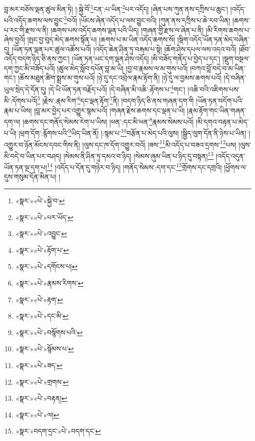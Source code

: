 བླ་མར་བཅོས་ལྡན་ཚུལ་མིན་ཏེ། །:སྐྱེ་བོ་\footnote{«སྣར་»«པེ་»སྐྱེ་བ་}ངན་:པ་ཡིན་\footnote{«སྣར་»«པེ་»པར་ཡོད་}པར་འདོད། །ཞེན་པས་ཀུན་ནས་དཀྲིས་པ་ཆུང་། །འདོད་པའི་འདོད་ཆགས་ལས་བྱུང་\footnote{«སྣར་»«པེ་»འབྱུང་}བའོ། །ཡོངས་ཞེན་འདོད་པ་ལས་བྱུང་བའི། །ཀུན་ནས་དཀྲིས་པ་ཆེ་རབ་ཡིན། །ཆགས་པ་རང་གི་རྫས་ལ་ནི། །ཆགས་པས་འདོད་ཆགས་ལྡན་པའི་ཡིད། །གཞན་གྱི་རྫས་ལ་ཞེན་པ་ནི། །མི་རིགས་ཆགས་པ་ཞེས་བྱའོ། །སྤང་བྱ་བུད་མེད་ཆགས་སྟོན་པ། །ཆགས་པ་མ་ཡིན་འདོད་ཆགས་སོ། །སྡིག་འདོད་ཡོན་ཏན་མེད་བཞིན་དུ། །ཡོན་ཏན་ལྡན་པར་ཚུལ་འཆོས་པའོ། །འདོད་ཆེན་ཤིན་ཏུ་བརྐམ་པ་སྟེ། །ཆོག་ཤེས་དཔལ་ལས་འདའ་བའོ། །ཐོབ་འདོད་བདག་ཉིད་ཅི་ནས་ཀྱང་། །ཡོན་ཏན་ཡང་དག་ལྡན་ཤེས་འདོད། །མི་བཟོད་གནོད་པ་བྱེད་པ་དང་། །སྡུག་བསྔལ་དག་ཀྱང་མི་བཟོད་པའོ། །ཚུལ་མེད་སློབ་དཔོན་བླ་མ་ཡི། །བྱ་བ་རྣམས་ལ་མ་གུས་པའོ། །བཀའ་བློ་བདེ་བ་མ་ཡིན་གང་། །ཆོས་མཐུན་ཚིག་སྨྲས་མ་གུས་པའོ། །ཉེ་དུ་དང་འབྲེལ་རྣམ་རྟོག་ནི། །ཉེ་དུ་ལ་བྱམས་ཆགས་པའོ། །དེ་བཞིན་ཡུལ་སྲེད་དེ་དོན་དུ། །དེ་ཡི་ཡོན་ཏན་བརྗོད་པའོ། །དེ་བཞིན་མི་འཆི་:རྟོགས་པ་\footnote{«སྣར་»«པེ་»རྟོག་པ་}གང་། །འཆི་བའི་འཇིགས་པས་མི་:དོགས་པའོ།\footnote{«སྣར་»«པེ་»དགོངས་པ།} །རྗེས་:རྣམ་རིག་\footnote{«སྣར་»«པེ་»རྣམས་རིགས་}དང་ལྡན་རྟོག་\footnote{«སྣར་»«པེ་»རྟག་}ནི། །བདག་ཉིད་ཅི་ནས་གཞན་དག་གི །ཡོན་ཏན་བདོག་པའི་རྣམ་པ་ཡིས། །བླ་མར་བྱེད་པར་འགྱུར་སྙམ་པའོ། །གཞན་རྗེས་ཆགས་དང་ལྡན་པ་ཡི། །རྣམ་རྟོག་གང་ཡིན་གཞན་དག་ལ། །ཆགས་དང་གནོད་སེམས་རེག་པ་ཡིས། །ཕན་:དང་མི་ཕན་\footnote{«སྣར་»«པེ་»དང་མི་}རྣམས་སེམས་པའོ། །མི་དགའ་བརྟན་པ་མེད་པ་ཡི། །ཕྲག་དོག་:རྙོགས་པའི་\footnote{«སྣར་»«པེ་»བསྙོགས་པའི་}ཡིད་ཡིན་ནོ། །:སྙམ་པ་\footnote{«སྣར་»«པེ་»སྙོམས་པ་}བརྩོན་པ་མེད་པའི་ལུས། །སྒྱིད་ལུག་དོན་ནི་ཉེས་པ་ཡིན། །འགྱུར་བ་ཉོན་མོངས་དབང་གིས་ནི། །ལུས་དང་ཁ་དོག་འགྱུར་བའོ། །ཟས་\footnote{«སྣར་»«པེ་»ཟད་}མི་འདོད་པ་བཟའ་དྲགས་\footnote{«སྣར་»«པེ་»གྲགས་}པས། །ལུས་མི་བདེ་བ་ཡིན་པར་བཤད། །སེམས་ནི་ཤིན་ཏུ་དམའ་བ་ཉིད། །སེམས་ཞུམ་ཡིན་པ་ཉིད་དུ་བསྟན།\footnote{«སྣར་»«པེ་»བརྟན།} །འདོད་འདུན་ཡོན་ཏན་ལྔ་དག་པ།\footnote{«སྣར་»«པེ་»ལ།} །འདོད་པ་དོན་དུ་གཉེར་བ་ཉིད། །གནོད་སེམས་:དག་དང་\footnote{«སྣར་»བདག་དྲང་«པེ་»བདག་དང་}གྲོགས་དང་དགྲའི། །ཕྱོགས་ལ་དུས་གསུམ་དོན་མིན་པ། །
